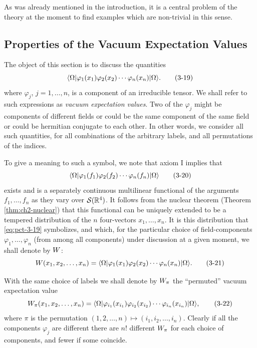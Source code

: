 \newtheorem*{pctremark}{Remark}

As was already mentioned in the introduction, it is a central problem of the
theory at the moment to find examples which are non-trivial in this sense.

\subsection{Properties of the Vacuum Expectation Values}
\label{sec:pct-3-3}

The object of this section is to discuss the quantities
\begin{equation}
 \langle \Omega\rvert\varphi_1(x_1)\varphi_2(x_2)\cdots
 \varphi_n(x_n)\lvert \Omega\rangle.
 \tag{3-19}\label{eq:pct-3-19}
\end{equation}
where $\varphi_j$, $j=1,\ldots,n$, is a component of an irreducible tensor.
We shall refer to such expressions as \emph{vacuum expectation values}. Two
of the $\varphi_j$ might be components of different fields or could be the
same component of the same field or could be hermitian conjugate to each
other. In other words, we consider all such quantities, for all combinations
of the arbitrary labels, and all permutations of the indices.

To give a meaning to such a symbol, we note that axiom I implies that
\begin{equation}
 \langle \Omega\rvert\varphi_1(f_1)\varphi_2(f_2)\cdots
 \varphi_n(f_n)\lvert \Omega\rangle
 \tag{3-20}\label{eq:pct-3-20}
\end{equation}
exists and is a separately continuous multilinear functional of the
arguments $f_1,\ldots,f_n$ as they vary over $\mathcal{S}(\mathbb{R}^4)$. It follows
from the nuclear theorem (Theorem \ref{thm:ch2-nuclear}) that this functional can be uniquely
extended to be a tempered distribution of the $n$ four-vectors
$x_1,\ldots,x_n$. It is this distribution that \eqref{eq:pct-3-19} symbolizes, and which,
for the particular choice of field-components $\varphi_1,\ldots,\varphi_n$
(from among all components) under discussion at a given moment, we shall
denote by $W$:
\begin{equation}
 W(x_1,x_2,\ldots,x_n)
 =\langle \Omega\rvert\varphi_1(x_1)\varphi_2(x_2)\cdots
 \varphi_n(x_n)\lvert \Omega\rangle.
 \tag{3-21}\label{eq:pct-3-21}
\end{equation}

With the same choice of labels we shall denote by $W_\pi$ the
“permuted” vacuum expectation value
\begin{equation}
 W_\pi(x_1,x_2,\ldots,x_n)
 =\langle \Omega\rvert\varphi_{i_1}(x_{i_1})\varphi_{i_2}(x_{i_2})\cdots
 \varphi_{i_n}(x_{i_n})\lvert \Omega\rangle,
 \tag{3-22}\label{eq:pct-3-22}
\end{equation}
where $\pi$ is the permutation
$(1,2,\ldots,n)\longmapsto(i_1,i_2,\ldots,i_n)$. Clearly if all the
components $\varphi_j$ are different there are $n!$ different $W_\pi$
for each choice of components, and fewer if some coincide.

